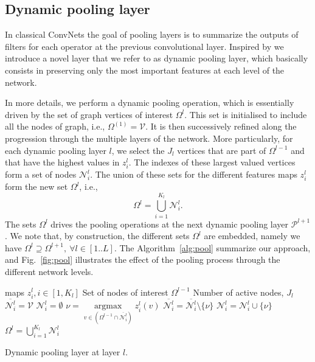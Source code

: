 \documentclass[10pt,journal,compsoc]{IEEEtran}
\begin{document}
	\subsection{Dynamic pooling layer}
	\label{s:pool}

	In classical ConvNets the goal of pooling layers is to summarize the outputs of filters for each operator at the previous convolutional layer. Inspired by \cite{bb:dmaxpool} we introduce a novel layer that we refer to as dynamic pooling layer, which basically consists in preserving only the most important features at each level of the network.

	In more details, we perform a dynamic pooling operation, which is essentially driven by the set of graph vertices of interest $\Omega^{l}$. This set is initialised to include all the nodes of graph, i.e., $\Omega^{(1)}= \mathcal{V}$. It is then successively refined along the progression through the multiple layers of the network. More particularly, for each dynamic pooling layer $l$, we select the $J_l$ vertices that are part of $\Omega^{l-1}$ and that have the highest values in $z_i^{l}$. The indexes of these largest valued vertices form a set of nodes $\mathcal{N}_i^{l}$. The union of these sets for the different features maps $z_i^{l}$ form the new set $\Omega^{l}$, i.e.,
	\begin{equation}
	\Omega^{l} = \bigcup\limits_{i=1}^{K_{l}}\mathcal{N}_i^{l} .
	\label{eq:omega}
	\end{equation}
	The sets $\Omega^{l}$  drives the pooling operations at the next dynamic pooling layer $\mathcal{P}^{l+1}$. We note that, by construction, the different sets $\Omega^{l}$ are embedded, namely we have $\Omega^{l}  \supseteq \Omega^{l+1}, \ \forall l \in [1..L]$. The Algorithm~\ref{alg:pool} summarize our approach, and Fig.~\ref{fig:pool} illustrates the effect of the pooling process through the different network levels.

	\begin{algorithm}[h!]
		\begin{algorithmic}[1]
			\quad \Feature maps $z_i^{l}, i \in [1,K_l]$
			\STATE \qquad\quad\quad Set of nodes of interest $\Omega^{l-1}$
			\STATE \qquad\quad\quad Number of active nodes, $J_l$
			\vspace{5pt}
			\STATE $\overline{\mathcal{N}_i^{l}} = \mathcal{V}$
			\STATE $\mathcal{N}_i^{l} = \emptyset $
			\STATE $\nu =  \mathop{\arg\max} \limits_{v \in \left(\Omega^{l-1} \cap \overline{\mathcal{N}_i^{l}} \right)} z_i^{l}(v)$
			\STATE $\overline{\mathcal{N}_i^{l}} = \overline{\mathcal{N}_i^{l}} \setminus \{\nu\}$
			\STATE $\mathcal{N}_i^{l} = \mathcal{N}_i^{l} \cup \{\nu\}$
			\ENDFOR
			\ENDFOR
			\STATE $\Omega^{l}=\bigcup\limits_{i=1}^{K_{l}}\mathcal{N}_i^{l}$
		\end{algorithmic}
		\caption{Dynamic pooling layer at layer $l$.}
		\label{alg:pool}
	\end{algorithm}
\end{document}
